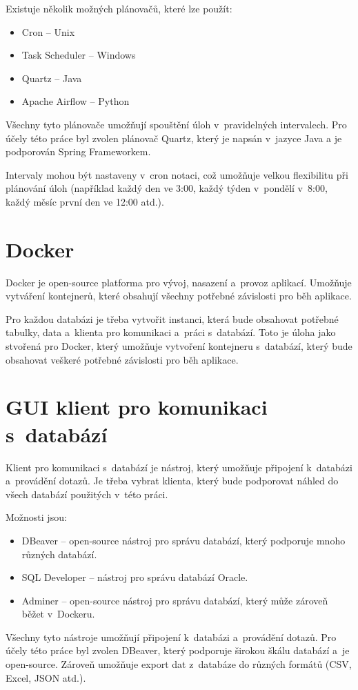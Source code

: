 Existuje několik možných plánovačů, které lze použít:
\begin{itemize}
    \item Cron -- Unix
    \item Task Scheduler -- Windows
    \item Quartz -- Java
    \item Apache Airflow -- Python
\end{itemize}

Všechny tyto plánovače umožňují spouštění úloh v~pravidelných intervalech.  
Pro účely této práce byl zvolen plánovač Quartz, který je napsán v~jazyce Java a  
je podporován Spring Frameworkem.  

Intervaly mohou být nastaveny v~cron notaci, což umožňuje velkou flexibilitu při plánování úloh  
(například každý den ve 3:00, každý týden v~pondělí v~8:00, každý měsíc první den ve 12:00 atd.).

\section{Docker}
Docker je open-source platforma pro vývoj, nasazení a~provoz aplikací.  
Umožňuje vytváření kontejnerů, které obsahují všechny potřebné závislosti pro běh aplikace.  

Pro každou databázi je třeba vytvořit instanci, která bude obsahovat potřebné tabulky, data  
a~klienta pro komunikaci a~práci s~databází. Toto je úloha jako stvořená pro Docker,  
který umožňuje vytvoření kontejneru s~databází, který bude obsahovat veškeré potřebné závislosti  
pro běh aplikace.  
\cite{docker}

\newpage

\section{GUI klient pro komunikaci s~databází}
Klient pro komunikaci s~databází je nástroj, který umožňuje připojení k~databázi a~provádění dotazů.  
Je třeba vybrat klienta, který bude podporovat náhled do všech databází použitých v~této práci.

Možnosti jsou:
\begin{itemize}
    \item DBeaver -- open-source nástroj pro správu databází, který podporuje mnoho různých databází.
    \item SQL Developer -- nástroj pro správu databází Oracle.
    \item Adminer -- open-source nástroj pro správu databází, který může zároveň běžet v~Dockeru.
\end{itemize}

Všechny tyto nástroje umožňují připojení k~databázi a~provádění dotazů.  
Pro účely této práce byl zvolen DBeaver, který podporuje širokou škálu databází a~je open-source.  
Zároveň umožňuje export dat z~databáze do různých formátů (CSV, Excel, JSON atd.).  
\cite{dbeaver}